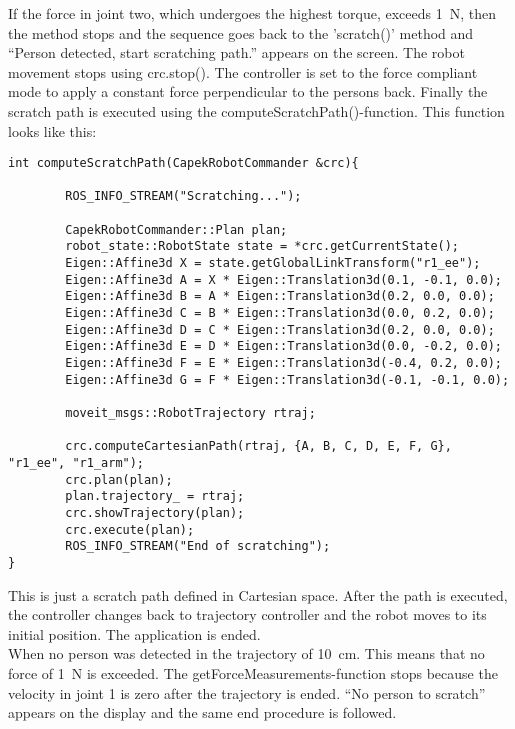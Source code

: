\documentclass[11pt,a4paper]{report}
\begin{document}
If the force in joint two, which undergoes the highest torque, exceeds 1~N, then the method stops and the sequence goes back to the 'scratch()' method and ``Person detected, start scratching path.'' appears on the screen. The robot movement stops using crc.stop(). The controller is set to the force compliant mode to apply a constant force perpendicular to the persons back. Finally the scratch path is executed using the computeScratchPath()-function. This function looks like this:
\begin{verbatim}
int computeScratchPath(CapekRobotCommander &crc){

	    ROS_INFO_STREAM("Scratching...");

	    CapekRobotCommander::Plan plan;
	    robot_state::RobotState state = *crc.getCurrentState();
	    Eigen::Affine3d X = state.getGlobalLinkTransform("r1_ee");
	    Eigen::Affine3d A = X * Eigen::Translation3d(0.1, -0.1, 0.0);
	    Eigen::Affine3d B = A * Eigen::Translation3d(0.2, 0.0, 0.0);
	    Eigen::Affine3d C = B * Eigen::Translation3d(0.0, 0.2, 0.0);
	    Eigen::Affine3d D = C * Eigen::Translation3d(0.2, 0.0, 0.0);
	    Eigen::Affine3d E = D * Eigen::Translation3d(0.0, -0.2, 0.0);
	    Eigen::Affine3d F = E * Eigen::Translation3d(-0.4, 0.2, 0.0);
	    Eigen::Affine3d G = F * Eigen::Translation3d(-0.1, -0.1, 0.0);
	
	    moveit_msgs::RobotTrajectory rtraj;

	    crc.computeCartesianPath(rtraj, {A, B, C, D, E, F, G}, "r1_ee", "r1_arm");
	    crc.plan(plan);
	    plan.trajectory_ = rtraj;
	    crc.showTrajectory(plan);
	    crc.execute(plan);
	    ROS_INFO_STREAM("End of scratching");
}
\end{verbatim}
This is just a scratch path defined in Cartesian space. After the path is executed, the controller changes back to trajectory controller and the robot moves to its initial position. The application is ended.\\
When no person was detected in the trajectory of 10~cm. This means that no force of 1~N is exceeded. The getForceMeasurements-function stops because the velocity in joint 1 is zero after the trajectory is ended. ``No person to scratch'' appears on the display and the same end procedure is followed.
\newpage
\end{document}
